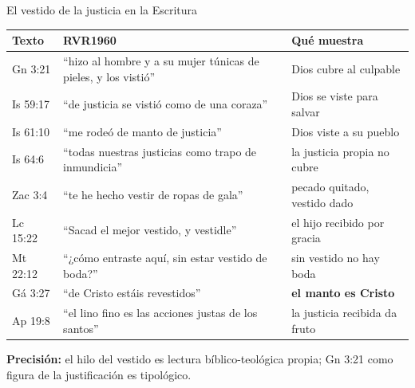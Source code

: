 \documentclass[hyperref={bookmarks=false},aspectratio=169]{beamer}
\newcommand{\destacar}[1]{\textbf{\textcolor{azul}{#1}}}
\newcommand{\precision}[1]{{\footnotesize\color{gris}\textbf{Precisión:} #1}}
\begin{document}
\begin{frame}{El vestido de la justicia en la Escritura}
\scriptsize\renewcommand{\arraystretch}{1.12}
\begin{tabular}{@{}>{\RaggedRight\arraybackslash}p{1.6cm}>{\RaggedRight\arraybackslash}p{6.2cm}>{\RaggedRight\arraybackslash}p{4.2cm}@{}}
\toprule
\textbf{Texto} & \textbf{RVR1960} & \textbf{Qué muestra} \\ \midrule
Gn 3:21 & ``hizo al hombre y a su mujer túnicas de pieles, y los vistió'' & Dios cubre al culpable \\
Is 59:17 & ``de justicia se vistió como de una coraza'' & Dios se viste para salvar \\
Is 61:10 & ``me rodeó de manto de justicia'' & Dios viste a su pueblo \\
Is 64:6 & ``todas nuestras justicias como trapo de inmundicia'' & la justicia propia no cubre \\
Zac 3:4 & ``te he hecho vestir de ropas de gala'' & pecado quitado, vestido dado \\
Lc 15:22 & ``Sacad el mejor vestido, y vestidle'' & el hijo recibido por gracia \\
Mt 22:12 & ``¿cómo entraste aquí, sin estar vestido de boda?'' & sin vestido no hay boda \\
Gá 3:27 & ``de Cristo estáis revestidos'' & \destacar{el manto es Cristo} \\
Ap 19:8 & ``el lino fino es las acciones justas de los santos'' & la justicia recibida da fruto \\
\bottomrule
\end{tabular}\par
\precision{el hilo del vestido es lectura bíblico-teológica propia; Gn 3:21 como figura de la justificación es tipológico.}
\end{frame}
\end{document}
